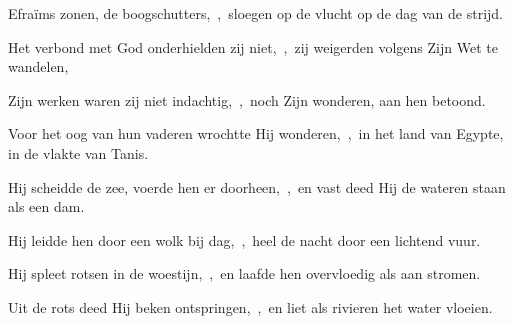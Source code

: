 \documentclass[12pt,twoside,a5paper]{article}
\begin{document}
\begin{halfparskip}

  Efraïms zonen, de boogschutters,~\sep\ sloegen op de vlucht op de dag van de strijd.

  Het verbond met God onderhielden zij niet,~\sep\ zij weigerden volgens Zijn Wet te wandelen,

  Zijn werken waren zij niet indachtig,~\sep\ noch Zijn wonderen, aan hen betoond.

  Voor het oog van hun vaderen wrochtte Hij wonderen,~\sep\ in het land van Egypte, in de vlakte van Tanis.

  Hij scheidde de zee, voerde hen er doorheen,~\sep\ en vast deed Hij de wateren staan als een dam.

  Hij leidde hen door een wolk bij dag,~\sep\ heel de nacht door een lichtend vuur.

  Hij spleet rotsen in de woestijn,~\sep\ en laafde hen overvloedig als aan stromen.

  Uit de rots deed Hij beken ontspringen,~\sep\ en liet als rivieren het water vloeien.
\end{halfparskip}
\end{document}
